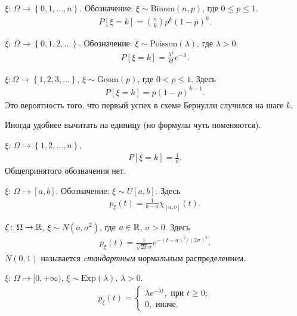 \begin{exmpl}
 $ \xi \colon\, \Omega \to \left\{ 0, 1, \ldots, n \right\} $. Обозначение: $ \xi \sim \mathrm{Binom}(n,p) $, где $ 0 \leqslant p \leqslant 1 $.
 \begin{align*}
  P[\xi = k] = \binom n k p^{k}(1-p)^{k}.
 \end{align*} 
\end{exmpl}
\begin{exmpl}
$ \xi \colon\, \Omega \to \left\{ 0, 1, 2, \ldots \right\} $. Обозначение: $ \xi \sim \mathrm{Poisson}(\lambda) $, где $ \lambda > 0 $.
  \begin{align*}
  P[\xi = k] = \frac{\lambda^{k}}{k!}e^{-\lambda}.
 \end{align*} 
\end{exmpl}
\begin{exmpl}
$ \xi \colon \Omega \to \left\{ 1,2,3, \ldots \right\} $, $ \xi \sim \mathrm{Geom}(p) $, где $ 0 < p \leqslant 1 $. Здесь
\begin{align*}
 P[\xi = k] = p(1 - p)^{k-1}.
\end{align*} Это вероятность того, что первый успех в схеме Бернулли случился на шаге $ k $.

 Иногда удобнее вычитать на единицу (но формулы чуть поменяются).
\end{exmpl}

\begin{exmpl}
 $ \xi \colon\, \Omega \to \left\{ 1,2,\ldots,n \right\} $,
 \begin{align*}
  P[\xi = k] = \frac{1}{n}.
 \end{align*} Общепринятого обозначения нет.
\end{exmpl}
\begin{exmpl}
 $ \xi\colon\,\Omega\to[a,b] $. Обозначение: $ \xi \sim U[a,b] $. Здесь
 \begin{align*}
  p_{\xi}(t) = \frac{1}{b-a} \chi_{[a,b]}(t).
 \end{align*} 
\end{exmpl}
\begin{exmpl}
$ \xi \colon\,\Omega \to \mathbb{R} $, $ \xi \sim N(a,\sigma^{2}) $, где $ a \in \mathbb{R} $, $ \sigma > 0 $. Здесь
\begin{align*}
 p_{\xi}(t) = \frac{1}{\sqrt{2\pi}\sigma}e^{-(t-a)^{2} / (2\sigma)^{2}}
.\end{align*} $ N(0,1) $ называется \textit{cтандартным} нормальным распределением.
\end{exmpl}
\begin{exmpl}
$ \xi \colon\,\Omega\to[0,+\infty) $, $ \xi \sim \mathrm{Exp}(\lambda) $, $ \lambda > 0 $.
\begin{align*}
 p_{\xi}(t) = \begin{cases}
   \lambda e^{-\lambda t}, \text{ при } t \geqslant 0;  \\
  0, \text{ иначе. }
 \end{cases} 
\end{align*} 
\end{exmpl}

